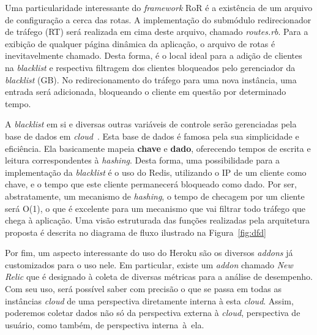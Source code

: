 Uma particularidade interessante do \emph{framework} RoR é a existência de um arquivo de configuração a cerca das rotas. A implementação do submódulo redirecionador de tráfego (RT) será realizada em cima deste arquivo, chamado \emph{routes.rb}. Para a exibição de qualquer página dinâmica da aplicação, o arquivo de rotas é inevitavelmente chamado. Desta forma, é o local ideal para a adição de clientes na \emph{blacklist} e respectiva filtragem dos clientes bloqueados pelo gerenciador da \emph{blacklist} (GB). No redirecionamento do tráfego para uma nova instância, uma entrada será adicionada, bloqueando o cliente em questão por determinado tempo.

A \emph{blacklist} em si e diversas outras variáveis de controle serão gerenciadas pela base de dados em \emph{cloud}~\cite{redis}. Esta base de dados é famosa pela sua simplicidade e eficiência. Ela basicamente mapeia \textbf{chave} e \textbf{dado}, oferecendo tempos de escrita e leitura correspondentes à \emph{hashing}. Desta forma, uma possibilidade para a implementação da \emph{blacklist} é o uso do Redis, utilizando o IP de um cliente como chave, e o tempo que este cliente permanecerá bloqueado como dado. Por ser, abstratamente, um mecanismo de \emph{hashing}, o tempo de checagem por um cliente será O(1), o que é excelente para um mecanismo que vai filtrar todo tráfego que chega à aplicação. Uma visão estruturada das funções realizadas pela arquitetura proposta é descrita no diagrama de fluxo ilustrado na Figura~\ref{fig:dfd}




Por fim, um aspecto interessante do uso do Heroku são os diversos \emph{addons} já customizados para o uso nele. Em particular, existe um \emph{addon} chamado \emph{New Relic} que é designado à coleta de diversas métricas para a análise de desempenho. Com seu uso, será possível saber com precisão o que se passa em todas as instâncias \emph{cloud} de uma perspectiva diretamente interna à esta \emph{cloud}. Assim, poderemos coletar dados não só da perspectiva externa à \emph{cloud}, perspectiva de usuário, como também, de perspectiva interna~à~ela.
